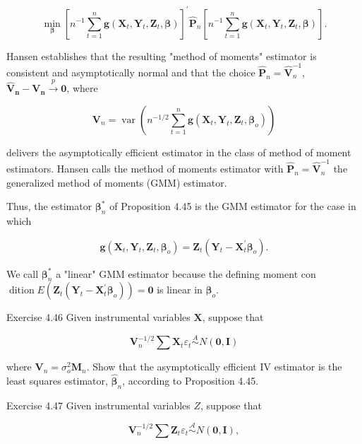 \documentclass[10pt]{article}
\begin{document}
$$
\min _{\boldsymbol{\beta}}\left[n^{-1} \sum_{t=1}^{n} \mathbf{g}\left(\mathbf{X}_{t}, \mathbf{Y}_{t}, \mathbf{Z}_{t}, \boldsymbol{\beta}\right)\right]^{\prime} \hat{\mathbf{P}}_{n}\left[n^{-1} \sum_{t=1}^{n} \mathbf{g}\left(\mathbf{X}_{t}, \mathbf{Y}_{t}, \mathbf{Z}_{t}, \boldsymbol{\beta}\right)\right] .
$$

Hansen establishes that the resulting "method of moments" estimator is consistent and asymptotically normal and that the choice $\hat{\mathbf{P}}_{n}=\hat{\mathbf{V}}_{n}^{-1}$, $\hat{\mathbf{V}}_{\boldsymbol{n}}-\mathbf{V}_{\boldsymbol{n}} \xrightarrow{p} \mathbf{0}$, where

$$
\mathbf{V}_{n}=\operatorname{var}\left(n^{-1 / 2} \sum_{t=1}^{n} \mathbf{g}\left(\mathbf{X}_{t}, \mathbf{Y}_{t}, \mathbf{Z}_{t}, \boldsymbol{\beta}_{o}\right)\right)
$$

delivers the asymptotically efficient estimator in the class of method of moment estimators. Hansen calls the method of moments estimator with $\hat{\mathbf{P}}_{n}=\hat{\mathbf{V}}_{n}^{-1}$ the generalized method of moments (GMM) estimator.

Thus, the estimator $\boldsymbol{\beta}_{n}^{*}$ of Proposition 4.45 is the GMM estimator for the case in which

$$
\mathbf{g}\left(\mathbf{X}_{t}, \mathbf{Y}_{t}, \mathbf{Z}_{t}, \boldsymbol{\beta}_{o}\right)=\mathbf{Z}_{t}\left(\mathbf{Y}_{t}-\mathbf{X}_{t}^{\prime} \boldsymbol{\beta}_{o}\right) .
$$

We call $\boldsymbol{\beta}_{n}^{*}$ a "linear" GMM estimator because the defining moment con$\operatorname{dition} E\left(\mathbf{Z}_{t}\left(\mathbf{Y}_{t}-\mathbf{X}_{t}^{\prime} \boldsymbol{\beta}_{o}\right)\right)=\mathbf{0}$ is linear in $\boldsymbol{\beta}_{o}$.

Exercise 4.46 Given instrumental variables $\mathbf{X}$, suppose that

$$
\mathbf{V}_{n}^{-1 / 2} \sum \mathbf{X}_{t} \varepsilon_{t} \stackrel{A}{\sim} N(\mathbf{0}, \mathbf{I})
$$

where $\mathbf{V}_{n}=\sigma_{o}^{2} \mathbf{M}_{n}$. Show that the asymptotically efficient IV estimator is the least squares estimator, $\hat{\boldsymbol{\beta}}_{n}$, according to Proposition 4.45.

Exercise 4.47 Given instrumental variables $Z$, suppose that

$$
\mathbf{V}_{n}^{-1 / 2} \sum \mathbf{Z}_{t} \varepsilon_{t} \stackrel{\mathcal{A}}{\sim} N(\mathbf{0}, \mathbf{I}),
$$
\end{document}
